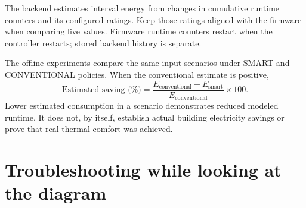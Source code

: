 \documentclass[11pt,a4paper]{article}
\begin{document}
The backend estimates interval energy from changes in cumulative
runtime counters and its configured ratings. Keep those ratings aligned
with the firmware when comparing live values. Firmware runtime counters
restart when the controller restarts; stored backend history is separate.

The offline experiments compare the same input scenarios under SMART
and CONVENTIONAL policies. When the conventional estimate is positive,
\[
 \text{Estimated saving (\%)} =
 \frac{E_{\mathrm{conventional}}-E_{\mathrm{smart}}}
 {E_{\mathrm{conventional}}}\times100.
\]
Lower estimated consumption in a scenario demonstrates reduced modeled
runtime. It does not, by itself, establish actual building electricity
savings or prove that real thermal comfort was achieved.

\section{Troubleshooting while looking at the diagram}
\end{document}
